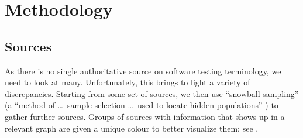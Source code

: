 \section{Methodology}
\label{methodology}

\subsection{Sources}
\label{sources}
As there is no single authoritative source on software testing terminology,
we need to look at many. Unfortunately, this brings to light a variety of
discrepancies. Starting from some set of sources, we then use
``snowball sampling'' (a ``method of \dots\ sample selection \dots\ used to
locate hidden populations'' \citep{Johnson2014})
to gather further sources. Groups of sources with
information that shows up in a relevant graph are given a unique colour to
better visualize them; see .

